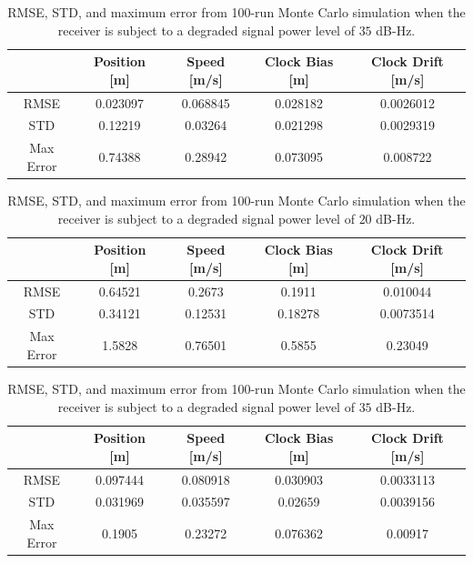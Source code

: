 \begin{table}[!ht]
    \caption{RMSE, STD, and maximum error from 100-run Monte Carlo simulation when the receiver is subject to a degraded signal power level of \(35\) dB-Hz.}\label{tbl:dyn35FVDM}
    \centering
    \begin{tabular}{ccccc}
        \toprule
                  & Position [m] & Speed [m/s] & Clock Bias [m] & Clock Drift [m/s] \\
        \midrule
        RMSE      & 0.023097     & 0.068845    & 0.028182       & 0.0026012         \\
        STD       & 0.12219      & 0.03264     & 0.021298       & 0.0029319         \\
        Max Error & 0.74388      & 0.28942     & 0.073095       & 0.008722          \\
        \bottomrule
    \end{tabular}
\end{table}

\begin{table}[!ht]
    \caption{RMSE, STD, and maximum error from 100-run Monte Carlo simulation when the receiver is subject to a degraded signal power level of \(20\) dB-Hz.}\label{tbl:dyn20FVDM}
    \centering
    \begin{tabular}{ccccc}
        \toprule
                  & Position [m] & Speed [m/s] & Clock Bias [m] & Clock Drift [m/s] \\
        \midrule
        RMSE      & 0.64521      & 0.2673      & 0.1911         & 0.010044          \\
        STD       & 0.34121      & 0.12531     & 0.18278        & 0.0073514         \\
        Max Error & 1.5828       & 0.76501     & 0.5855         & 0.23049           \\
        \bottomrule
    \end{tabular}
\end{table}

\begin{table}[!ht]
    \caption{RMSE, STD, and maximum error from 100-run Monte Carlo simulation when the receiver is subject to a degraded signal power level of \(35\) dB-Hz.}\label{tbl:dyn35CV}
    \centering
    \begin{tabular}{ccccc}
        \toprule
                  & Position [m] & Speed [m/s] & Clock Bias [m] & Clock Drift [m/s] \\
        \midrule
        RMSE      & 0.097444     & 0.080918    & 0.030903       & 0.0033113         \\
        STD       & 0.031969     & 0.035597    & 0.02659        & 0.0039156         \\
        Max Error & 0.1905       & 0.23272     & 0.076362       & 0.00917           \\
        \bottomrule
    \end{tabular}
\end{table}

